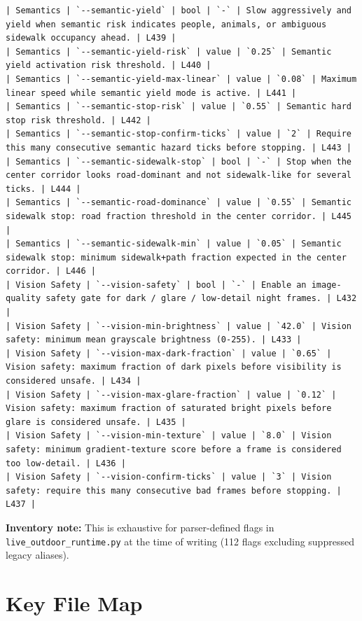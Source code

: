 \documentclass[11pt]{article}
\begin{document}
\begin{lstlisting}
| Semantics | `--semantic-yield` | bool | `-` | Slow aggressively and yield when semantic risk indicates people, animals, or ambiguous sidewalk occupancy ahead. | L439 |
| Semantics | `--semantic-yield-risk` | value | `0.25` | Semantic yield activation risk threshold. | L440 |
| Semantics | `--semantic-yield-max-linear` | value | `0.08` | Maximum linear speed while semantic yield mode is active. | L441 |
| Semantics | `--semantic-stop-risk` | value | `0.55` | Semantic hard stop risk threshold. | L442 |
| Semantics | `--semantic-stop-confirm-ticks` | value | `2` | Require this many consecutive semantic hazard ticks before stopping. | L443 |
| Semantics | `--semantic-sidewalk-stop` | bool | `-` | Stop when the center corridor looks road-dominant and not sidewalk-like for several ticks. | L444 |
| Semantics | `--semantic-road-dominance` | value | `0.55` | Semantic sidewalk stop: road fraction threshold in the center corridor. | L445 |
| Semantics | `--semantic-sidewalk-min` | value | `0.05` | Semantic sidewalk stop: minimum sidewalk+path fraction expected in the center corridor. | L446 |
| Vision Safety | `--vision-safety` | bool | `-` | Enable an image-quality safety gate for dark / glare / low-detail night frames. | L432 |
| Vision Safety | `--vision-min-brightness` | value | `42.0` | Vision safety: minimum mean grayscale brightness (0-255). | L433 |
| Vision Safety | `--vision-max-dark-fraction` | value | `0.65` | Vision safety: maximum fraction of dark pixels before visibility is considered unsafe. | L434 |
| Vision Safety | `--vision-max-glare-fraction` | value | `0.12` | Vision safety: maximum fraction of saturated bright pixels before glare is considered unsafe. | L435 |
| Vision Safety | `--vision-min-texture` | value | `8.0` | Vision safety: minimum gradient-texture score before a frame is considered too low-detail. | L436 |
| Vision Safety | `--vision-confirm-ticks` | value | `3` | Vision safety: require this many consecutive bad frames before stopping. | L437 |
\end{lstlisting}

\textbf{Inventory note:} This is exhaustive for parser-defined flags in
\texttt{live\_outdoor\_runtime.py} at the time of writing (112 flags excluding
suppressed legacy aliases).

\section{Key File Map}
\end{document}
